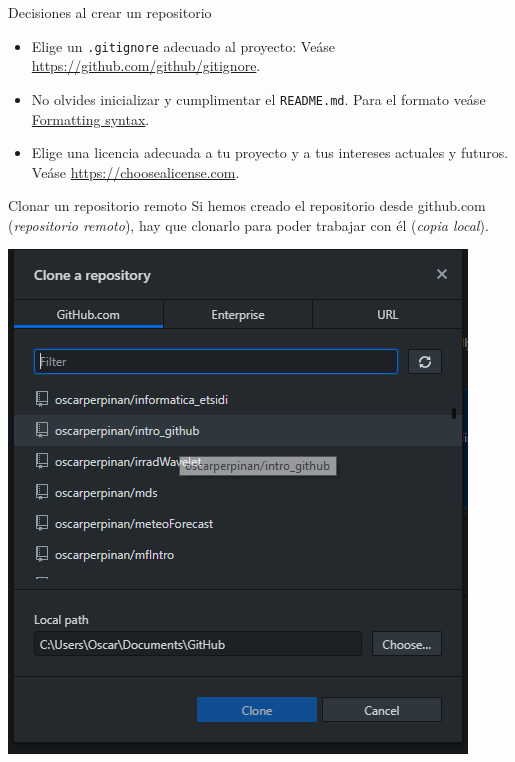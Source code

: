 \documentclass[xcolor={usenames,svgnames,dvipsnames}]{beamer}
\begin{document}
\begin{frame}[fragile,label={sec:org28ec52b}]{Decisiones al crear un repositorio}
 \begin{itemize}
\item Elige un \alert{\texttt{.gitignore}} adecuado al proyecto: Veáse \url{https://github.com/github/gitignore}.
\item No olvides inicializar y cumplimentar el \alert{\texttt{README.md}}. Para el formato veáse \href{https://help.github.com/articles/basic-writing-and-formatting-syntax/}{Formatting syntax}.
\item Elige una \alert{licencia} adecuada a tu proyecto y a tus intereses actuales y futuros. Veáse \url{https://choosealicense.com}.
\end{itemize}
\end{frame}

\begin{frame}[label={sec:org0a5f60c}]{Clonar un repositorio remoto}
Si hemos creado el repositorio desde github.com (\emph{repositorio remoto}), hay que clonarlo para poder trabajar con él (\emph{copia local}).

\begin{center}
\end{center}

\begin{center}
\includegraphics[height=0.65\textheight]{figs/Desktop_CloneRepository.png}
\end{center}
\end{frame}
\end{document}
